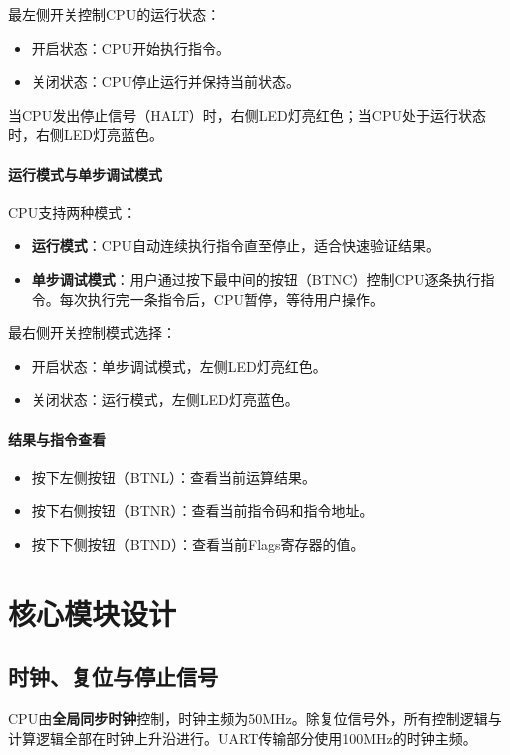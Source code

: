 \documentclass[lang=cn,a4paper,newtx]{elegantpaper}
\begin{document}
最左侧开关控制CPU的运行状态：
\begin{itemize}
  \item 开启状态：CPU开始执行指令。
  \item 关闭状态：CPU停止运行并保持当前状态。
\end{itemize}
当CPU发出停止信号（HALT）时，右侧LED灯亮红色；当CPU处于运行状态时，右侧LED灯亮蓝色。

\paragraph{运行模式与单步调试模式}

CPU支持两种模式：
\begin{itemize}
  \item \textbf{运行模式}：CPU自动连续执行指令直至停止，适合快速验证结果。
  \item \textbf{单步调试模式}：用户通过按下最中间的按钮（BTNC）控制CPU逐条执行指令。每次执行完一条指令后，CPU暂停，等待用户操作。
\end{itemize}

最右侧开关控制模式选择：
\begin{itemize}
  \item 开启状态：单步调试模式，左侧LED灯亮红色。
  \item 关闭状态：运行模式，左侧LED灯亮蓝色。
\end{itemize}

\paragraph{结果与指令查看}

\begin{itemize}
  \item 按下左侧按钮（BTNL）：查看当前运算结果。
  \item 按下右侧按钮（BTNR）：查看当前指令码和指令地址。
  \item 按下下侧按钮（BTND）：查看当前Flags寄存器的值。
\end{itemize}
\section{核心模块设计}
\subsection{时钟、复位与停止信号}
CPU由\textbf{全局同步时钟}控制，时钟主频为50MHz。除复位信号外，所有控制逻辑与计算逻辑全部在时钟上升沿进行。UART传输部分使用100MHz的时钟主频。
\end{document}
